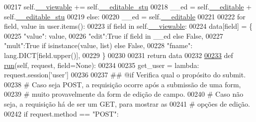 \begin{DoxyCode}
00217             self.\hyperlink{classProfile_1_1ProfileUnit_1_1UiFullProfile_a92a8fe9852ca9a15af9f0b3b1f7f3475}{\_\_viewable} += self.\hyperlink{classProfile_1_1ProfileUnit_1_1UiFullProfile_ac0498ee9df8afbed7dd944fe293b6c44}{\_\_editable\_stu}
00218             \_\_ed = self.\hyperlink{classProfile_1_1ProfileUnit_1_1UiFullProfile_ad83bd84ca790c9c849a29ff074848bd4}{\_\_editable} + self.\hyperlink{classProfile_1_1ProfileUnit_1_1UiFullProfile_ac0498ee9df8afbed7dd944fe293b6c44}{\_\_editable\_stu}
00219         \textcolor{keywordflow}{else}:
00220             \_\_ed = self.\hyperlink{classProfile_1_1ProfileUnit_1_1UiFullProfile_ad83bd84ca790c9c849a29ff074848bd4}{\_\_editable}
00221 
00222         \textcolor{keywordflow}{for} field, value \textcolor{keywordflow}{in} user.items():
00223             \textcolor{keywordflow}{if} field \textcolor{keywordflow}{in} self.\hyperlink{classProfile_1_1ProfileUnit_1_1UiFullProfile_a92a8fe9852ca9a15af9f0b3b1f7f3475}{\_\_viewable}:
00224                 data[field] = \{
00225                     \textcolor{stringliteral}{"value"}: value,
00226                     \textcolor{stringliteral}{"edit"}:\textcolor{keyword}{True} \textcolor{keywordflow}{if} field \textcolor{keywordflow}{in} \_\_ed \textcolor{keywordflow}{else} \textcolor{keyword}{False},
00227                     \textcolor{stringliteral}{"mult"}:\textcolor{keyword}{True} \textcolor{keywordflow}{if} isinstance(value, list)  \textcolor{keywordflow}{else} \textcolor{keyword}{False},
00228                     \textcolor{stringliteral}{"fname"}: lang.DICT[field.upper()],
00229                             \}
00230 
00231         \textcolor{keywordflow}{return} data
00232 
\hypertarget{ProfileUnit_8py_source_l00233}{}\hyperlink{classProfile_1_1ProfileUnit_1_1UiFullProfile_a7a7747246b627020a345f7a3eac27778}{00233}     \textcolor{keyword}{def }\hyperlink{classProfile_1_1ProfileUnit_1_1UiFullProfile_a7a7747246b627020a345f7a3eac27778}{run}(self, request, field=None):
00234 
00235         get\_user = \textcolor{keyword}{lambda}: request.session[\textcolor{stringliteral}{'user'}]
00236 
00237         \textcolor{comment}{## @if Verifica qual o propósito do submit.}
00238         \textcolor{comment}{#   Caso seja POST, a requisição ocorre após a submissão de uma form,}
00239         \textcolor{comment}{#       muito provavelmente da form de edição de campo.}
00240         \textcolor{comment}{#   Caso não seja, a requisição há de ser um GET, para mostrar as}
00241         \textcolor{comment}{#       opções de edição.}
00242         \textcolor{keywordflow}{if} request.method == \textcolor{stringliteral}{"POST"}:

\end{DoxyCode}
